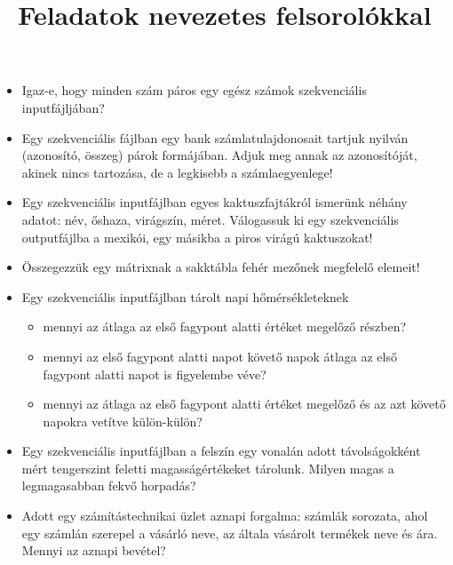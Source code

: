 \documentclass[12pt,a4paper]{article}
\title{Feladatok nevezetes felsorolókkal}
\begin{document}
\maketitle

\begin{itemize}
\item Igaz-e, hogy minden szám páros egy egész számok szekvenciális inputfájljában? 
\item Egy szekvenciális fájlban egy bank számlatulajdonosait tartjuk nyilván (azonosító, összeg) párok formájában. Adjuk meg annak az azonosítóját, akinek nincs tartozása, de a legkisebb a számlaegyenlege!
\item Egy  szekvenciális  inputfájlban  egyes  kaktuszfajtákról ismerünk  néhány  adatot:  név, őshaza,  virágszín,  méret.  Válogassuk  ki  egy  szekvenciális  outputfájlba  a  mexikói,  egy másikba a piros virágú kaktuszokat!
\item Összegezzük egy mátrixnak a sakktábla fehér mezőnek megfelelő elemeit!
\item Egy szekvenciális inputfájlban tárolt napi hőmérsékleteknek 
\begin{itemize}
\item mennyi az átlaga az első fagypont alatti értéket megelőző részben?
\item mennyi az első fagypont alatti napot követő napok átlaga az első fagypont alatti napot is figyelembe véve?
\item mennyi az átlaga az első fagypont alatti értéket megelőző és az azt követő napokra vetítve külön-külön?
\end{itemize}
\item Egy szekvenciális inputfájlban a felszín egy vonalán adott távolságokként mért tengerszint feletti magasságértékeket tárolunk. Milyen magas a legmagasabban fekvő horpadás?
\item Adott egy számítástechnikai üzlet aznapi forgalma: számlák sorozata, ahol egy számlán szerepel a vásárló neve, az általa vásárolt termékek neve és ára. Mennyi az aznapi bevétel?
\end{itemize}
\end{document}
